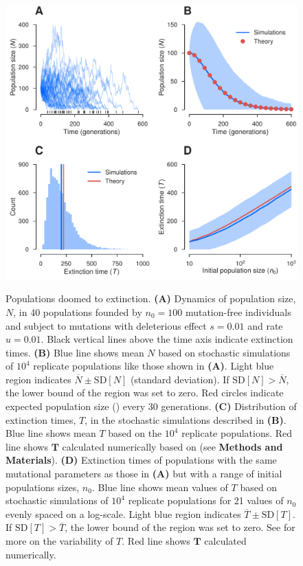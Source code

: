 \documentclass[9pt,lineno]{elife}
\begin{document}
\begin{figure}[ht!]
\includegraphics[width=.67\linewidth]{decay.pdf}
\caption{Populations doomed to extinction.  
%
\textbf{(A)} Dynamics of population size, $N$, in 40 populations founded by $n_0=100$ mutation-free individuals and subject to mutations with deleterious effect $s=0.01$ and rate $u=0.01$.  Black vertical lines above the time axis indicate extinction times.
%
\textbf{(B)} Blue line shows mean $N$ based on stochastic simulations of $10^4$ replicate populations like those shown in \textbf{(A)}.  
Light blue region indicates $\overline{N} \pm \mathrm{SD}[N]$ (standard deviation). If $\mathrm{SD}[N] > \overline{N}$, the lower bound of the region was set to zero.  
Red circles indicate expected population size () every 30 generations.
%
\textbf{(C)} Distribution of extinction times, $T$, in the stochastic simulations described in \textbf{(B)}. 
Blue line shows mean $T$ based on the $10^4$ replicate populations.  
Red line shows $\mathbf{T}$ calculated numerically based on  (see \textbf{Methods and Materials}).  
%
\textbf{(D)} Extinction times of populations with the same mutational parameters as those in \textbf{(A)} but with a range of initial populations sizes, $n_0$.
%
Blue line shows mean values of $T$ based on stochastic simulations of $10^4$ replicate populations for 21 values of $n_0$ evenly spaced on a log-scale.
%
Light blue region indicates $\overline{T} \pm  \mathrm{SD}[T]$. If $\mathrm{SD}[T] > \overline{T}$, the lower bound of the region was set to zero.  See  for more on the variability of $T$.
%
Red line shows $\mathbf{T}$ calculated numerically.}
\label{fig:decay}
\label{figsupp:sf1}
\end{figure}
\end{document}
